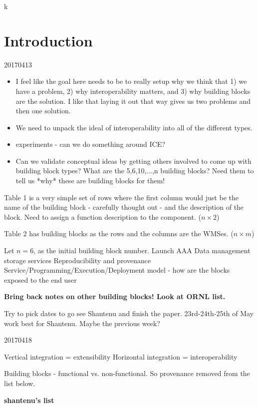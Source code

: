 k\section{Introduction}

20170413
\begin{itemize}
\item I feel like the goal here needs to be to really setup why we think that 1) we have a problem, 2) why interoperability matters, and 3) why building blocks are the solution. I like that laying it out that way gives us two problems and then one solution.
\item We need to unpack the ideal of interoperability into all of the different types.
\item experiments - can we do something around ICE?
\item Can we validate conceptual ideas by getting others involved to come up with building block types? What are the 5,6,10,...,n building blocks? Need them to tell us *why* these are building blocks for them!
\end{itemize}

Table 1 is a very simple set of rows where the first column would just be the name of the building block - carefully thought out - and the description of the block. Need to assign a function description to the component. ($n \times 2$)

Table 2 has building blocks as the rows and the columns are the WMSes. ($n \times m$)

Let $n = 6$, as the initial building block number.
Launch
AAA
Data management storage services
Reproducibility and provenance
Service/Programming/Execution/Deployment model - how are the blocks exposed to the end user

\textbf{Bring back notes on other building blocks! Look at ORNL list.}

Try to pick dates to go see Shantenu and finish the paper. 23rd-24th-25th of May work best for Shantenu. Maybe the previous week?

20170418

Vertical integration = extensibility
Horizontal integration = interoperability

Building blocks - functional vs. non-functional. So provenance removed from the list below.

\bf{shantenu's list}


